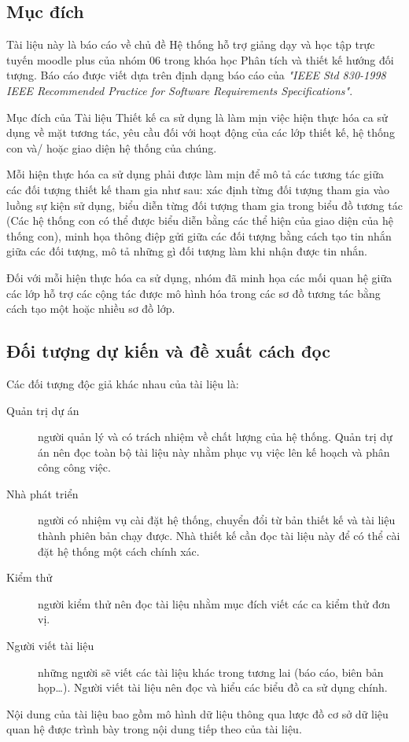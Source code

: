 \documentclass[./../main_file.tex]{subfiles}
\begin{document}
\subsection{Mục đích}

Tài liệu này là báo cáo về chủ đề Hệ thống hỗ trợ giảng dạy và học tập trực tuyến moodle plus của nhóm 06 trong khóa học Phân tích và thiết kế hướng đối tượng.
Báo cáo được viết dựa trên định dạng báo cáo của  \textit{"IEEE Std 830-1998 IEEE Recommended Practice for Software Requirements Specifications"}.


Mục đích của Tài liệu Thiết kế ca sử dụng là làm mịn việc hiện thực hóa ca sử dụng về mặt tương tác, yêu cầu đối với hoạt động của các lớp thiết kế, hệ thống con và/ hoặc giao diện hệ thống của chúng.


Mỗi hiện thực hóa ca sử dụng phải được làm mịn để mô tả các tương tác giữa các đối tượng thiết kế tham gia như sau: xác định từng đối tượng tham gia vào luồng sự kiện sử dụng, biểu diễn từng đối tượng tham gia trong biểu đồ  tương tác (Các hệ thống con có thể được biểu diễn bằng các thể hiện của giao diện của hệ thống con), minh họa thông điệp gửi giữa các đối tượng bằng cách tạo tin nhắn giữa các đối tượng, mô tả những gì đối tượng làm khi nhận được tin nhắn.


Đối với mỗi hiện thực hóa ca sử dụng, nhóm đã minh họa các mối quan hệ giữa các lớp hỗ trợ các cộng tác được mô hình hóa trong các sơ đồ tương tác bằng cách tạo một hoặc nhiều sơ đồ lớp.



\subsection{Đối tượng dự kiến và đề xuất cách đọc}

Các đối tượng độc giả khác nhau của tài liệu là:
\begin{description}
	\item[Quản trị dự án] người quản lý và có trách nhiệm về chất lượng của hệ thống. Quản trị dự án nên đọc toàn bộ tài liệu này nhằm phục vụ việc lên kế hoạch và phân công công việc.
	\item[Nhà phát triển] người có nhiệm vụ cài đặt hệ thống, chuyển đổi từ bản thiết kế và tài liệu thành phiên bản chạy được. Nhà thiết kế cần đọc tài liệu này để có thể cài đặt hệ thống một cách chính xác.
	\item[Kiểm thử] người kiểm thử nên đọc tài liệu nhằm mục đích viết các ca kiểm thử đơn vị.
	\item[Người viết tài liệu] những người sẽ viết các tài liệu khác trong tương lai (báo cáo, biên bản họp…). Người viết tài liệu nên đọc và hiểu các biểu đồ ca sử dụng chính.
\end{description}
	Nội dung của tài liệu bao gồm mô hình dữ liệu thông qua lược đồ cơ sở dữ liệu quan hệ được trình bày trong nội dung tiếp theo của tài liệu.
\end{document}
